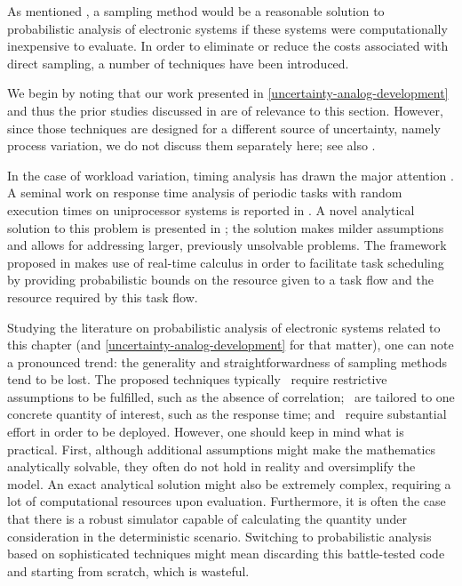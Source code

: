 As mentioned , a sampling method would be a reasonable solution to
probabilistic analysis of electronic systems if these systems were
computationally inexpensive to evaluate. In order to eliminate or reduce the
costs associated with direct sampling, a number of techniques have been
introduced.

We begin by noting that our work presented in
\cref{uncertainty-analog-development} and thus the prior studies discussed in
 are of relevance to this section. However, since those
techniques are designed for a different source of uncertainty, namely process
variation, we do not discuss them separately here; see also
.

In the case of workload variation, timing analysis has drawn the major attention
\cite{quinton2012}. A seminal work on response time analysis of periodic tasks
with random execution times on uniprocessor systems is reported in
\cite{diaz2002}. A novel analytical solution to this problem is presented in
\cite{tanasa2015}; the solution makes milder assumptions and allows for
addressing larger, previously unsolvable problems. The framework proposed in
\cite{santinelli2011} makes use of real-time calculus in order to facilitate
task scheduling by providing probabilistic bounds on the resource given to a
task flow and the resource required by this task flow.

Studying the literature on probabilistic analysis of electronic systems related
to this chapter (and \cref{uncertainty-analog-development} for that matter), one
can note a pronounced trend: the generality and straightforwardness of sampling
methods tend to be lost. The proposed techniques typically \one~require
restrictive assumptions to be fulfilled, such as the absence of correlation;
\two~are tailored to one concrete quantity of interest, such as the response
time; and \three~require substantial effort in order to be deployed. However,
one should keep in mind what is practical. First, although additional
assumptions might make the mathematics analytically solvable, they often do not
hold in reality and oversimplify the model. An exact analytical solution might
also be extremely complex, requiring a lot of computational resources upon
evaluation. Furthermore, it is often the case that there is a robust simulator
capable of calculating the quantity under consideration in the deterministic
scenario. Switching to probabilistic analysis based on sophisticated techniques
might mean discarding this battle-tested code and starting from scratch, which
is wasteful.

